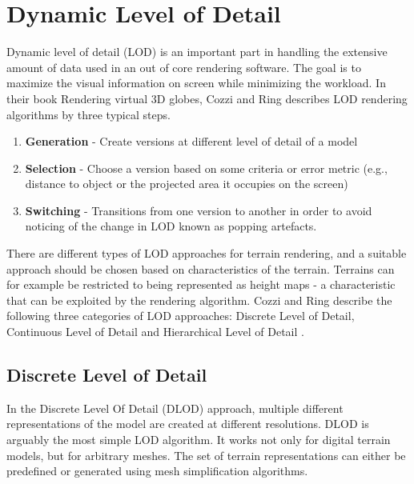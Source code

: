 \section{Dynamic Level of Detail}
Dynamic level of detail (LOD) is an important part in handling the extensive amount of data used in an out of core rendering software. The goal is to maximize the visual information on screen while minimizing the workload. In their book Rendering virtual 3D globes, Cozzi and Ring describes LOD rendering algorithms by three typical steps. \cite[p. 367]{cozzi11}

\begin{enumerate}
    \item \textbf{Generation} - Create versions at different level of detail of a model
    \item \textbf{Selection} - Choose a version based on some criteria or error metric (e.g., distance to object or the projected area it occupies on the screen)
    \item \textbf{Switching} - Transitions from one version to another in order to avoid noticing of the change in LOD known as popping artefacts.
\end{enumerate}

There are different types of LOD approaches for terrain rendering, and a suitable approach should be chosen based on characteristics of the terrain. Terrains can for example be restricted to being represented as height maps - a characteristic that can be exploited by the rendering algorithm. Cozzi and Ring describe the following three categories of LOD approaches: Discrete Level of Detail, Continuous Level of Detail and Hierarchical Level of Detail \cite[p. 368-371]{cozzi11}.

\subsection{Discrete Level of Detail}
In the Discrete Level Of Detail (DLOD) approach, multiple different representations of the model are created at different resolutions. DLOD is arguably the most simple LOD algorithm. It works not only for digital terrain models, but for arbitrary meshes. The set of terrain representations can either be predefined or generated using mesh simplification algorithms.

